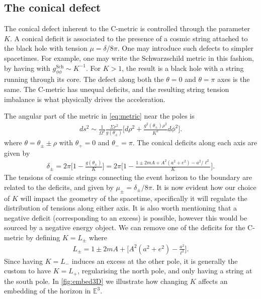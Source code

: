 \documentclass[
twoside,openright,frontopenright]{dmathesis}
\begin{document}

\subsection{The conical defect}
The conical defect inherent to the C-metric is controlled through the parameter
$K$. A conical deficit is associated to the presence of a cosmic string attached
to the black hole with tension $\mu = \delta/8\pi$. One may introduce such
defects to simpler spacetimes. For example, one may write the Schwarzschild
metric in this fashion, by having with $g^{\mathrm{Sch}}_{\phi\phi}\sim
K^{-1}$. For $K>1$, the result is a black hole with a string running through its
core. The defect along both the $\theta = 0$ and $\theta= \pi$ axes is the
same. The C-metric has unequal deficits, and the resulting string tension
imbalance is what physically drives the acceleration.

The angular part of the metric in \cref{eq:metric} near the poles is
\begin{align}
ds^2 \sim \frac{1}{\Omega^2}\frac{\Sigma r^2}{g(\theta_{\pm})}\bigg[d\rho^2 +
  \frac{g^2(\theta_{\pm}) \rho^{2}}{K^2}d\phi^2\bigg]. 
\end{align}
where $\theta = \theta_{\pm} \pm \rho$ with $\theta_+=0$ and $\theta_-=\pi$. The
conical deficits along each axis are given by 
\begin{align}\label{eq:deficits}
\delta_\pm=2\pi\bigg[1-\frac{g(\theta_\pm)}{K}\bigg] = 2\pi\bigg[1-\frac{1\pm
  2mA + A^2(a^2+e^2)-a^2/\ell^2}{K}\bigg]. 
\end{align} 
The tensions of cosmic strings connecting the event horizon to the boundary are
related to the deficits, and given by $\mu_\pm=\delta_\pm/8\pi$. It is now
evident how our choice of $K$ will impact the geometry of the spacetime,
specifically it will regulate the distribution of tensions along either axis. It
is also worth mentioning that a negative deficit (corresponding to an excess) is
possible, however this would be sourced by a negative energy object. We can
remove one of the deficits for the C-metric by defining $K=L_\pm$ where
\begin{align}
L_\pm=1\pm 2mA + \bigg[A^2(a^2+e^2)-\frac{a^2}{\ell^2}\bigg].
\end{align}
Since having $K=L_-$ induces an excess at the other pole, it is generally the
custom to have $K=L_+$, regularising the north pole, and only having a string at
the south pole. In \cref{fig:embed3D} we illustrate how changing $K$ affects an
embedding of the horizon in $\mathbb{E}^3$. 
\end{document}
